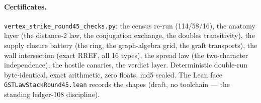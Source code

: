 \documentclass[11pt]{article}
\begin{document}
\paragraph{Certificates.}  \texttt{vertex\_strike\_round45\_checks.py}: the census re-run
(114/58/16), the anatomy layer (the distance-2 law, the conjugation exchange, the doubles
transitivity), the supply closure battery (the ring, the graph-algebra grid, the graft
transports), the wall intersection (exact RREF, all 16 types), the spread law (the
two-character independence), the hostile canaries, the verdict layer.  Deterministic
double-run byte-identical, exact arithmetic, zero floats, md5 sealed.  The Lean face
\texttt{GSTLawStackRound45.lean} records the shapes (draft, no toolchain --- the standing
ledger-108 discipline).
\end{document}
